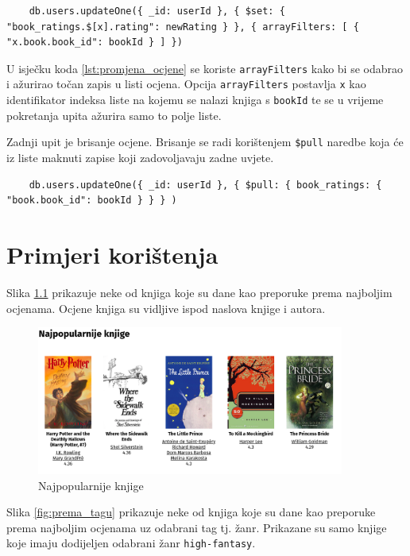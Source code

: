 \documentclass[]{foi}
\begin{document}
\begin{verbatim}
    db.users.updateOne({ _id: userId }, { $set: { "book_ratings.$[x].rating": newRating } }, { arrayFilters: [ { "x.book.book_id": bookId } ] })
\end{verbatim}
\label{lst:promjena_ocjene}

U isječku koda \ref{lst:promjena_ocjene} se koriste \texttt{arrayFilters} kako bi se odabrao i ažurirao točan zapis u listi ocjena.
Opcija \texttt{arrayFilters} postavlja \texttt{x} kao identifikator indeksa liste na kojemu se nalazi knjiga s \texttt{bookId} te se u
vrijeme pokretanja upita ažurira samo to polje liste.

Zadnji upit je brisanje ocjene. Brisanje se radi korištenjem \texttt{\$pull} naredbe koja će iz liste maknuti zapise koji zadovoljavaju zadne uvjete.
\begin{verbatim}
    db.users.updateOne({ _id: userId }, { $pull: { book_ratings: { "book.book_id": bookId } } } )
\end{verbatim}
\label{lst:brisanje_ocjene}

\chapter{Primjeri korištenja}

Slika \ref{fig:najpopulranije_knjige} prikazuje neke od knjiga koje su dane kao preporuke prema najboljim ocjenama.
Ocjene knjiga su vidljive ispod naslova knjige i autora.

\begin{figure}[h!]
	\centering
	\includegraphics[width=0.9\textwidth]{slike/najpop.png}
	\caption{Najpopularnije knjige}
	\label{fig:najpopulranije_knjige}
\end{figure}

Slika \ref{fig:prema_tagu} prikazuje neke od knjiga koje su dane kao preporuke prema najboljim ocjenama uz odabrani tag tj. žanr.
Prikazane su samo knjige koje imaju dodijeljen odabrani žanr \texttt{high-fantasy}.
\end{document}
